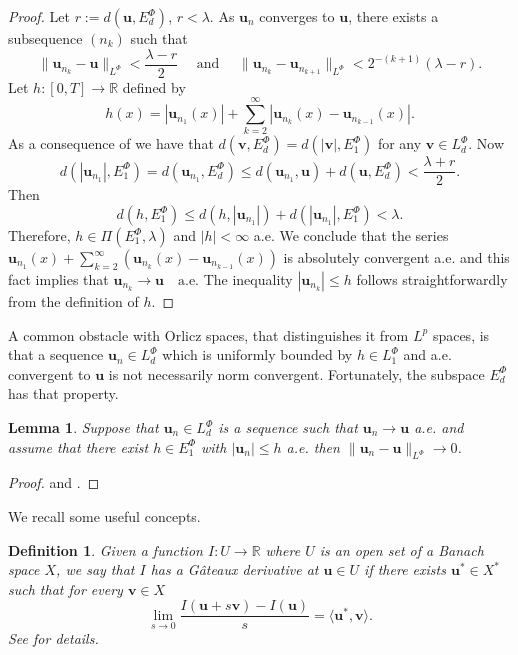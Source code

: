 \documentclass[twoside]{article}
\newtheorem{lem}[thm]{Lemma}
\newtheorem{defi}[thm]{Definition}
\theoremstyle{remark}
\newcommand{\orlnor}{\|_{L^{\Phi}}}
\newcommand{\lphi}{L^{\Phi}}
\newcommand{\ephi}{E^{\Phi}}
\renewcommand{\b}[1]{\boldsymbol{#1}}
\renewcommand{\leq}{\leqslant}
\begin{document}
\begin{proof}
Let $r:=d(\b{u},\ephi_d)$, $r<\lambda$. As $\b{u}_n$ converges to $\b{u}$, there exists a subsequence $(n_k)$ such that
\[\|\b{u}_{n_k}-\b{u}\orlnor<\frac{\lambda-r}{2}\quad \text{ and }\quad \|\b{u}_{n_k}-\b{u}_{n_{k+1}}\orlnor<2^{-(k+1)}(\lambda-r).\]
Let $h:[0,T]\rightarrow\mathbb{R}$ defined by
\begin{equation}\label{serie} h(x)=|\b{u}_{n_1}(x)|+\sum_{k=2}^{\infty}|\b{u}_{n_k}(x)-\b{u}_{n_{k-1}}(x)|.
\end{equation}
As a consequence  of \cite[Lemma 10.1]{KR} we have that $d(\b{v},\ephi_d)=d(|\b{v}|,\ephi_1)$ for any $\b{v}\in\lphi_d$. 
Now
\[d(|\b{u}_{n_1}|,\ephi_1)= d(\b{u}_{n_1},\ephi_d)\leq d(\b{u}_{n_1},\b{u})+d(\b{u},\ephi_d)<\frac{\lambda+r}{2}.\]
Then
\[d(h,\ephi_1)\leq d(h,|\b{u}_{n_1}|)+d(|\b{u}_{n_1}|,\ephi_1)< \lambda.\]
Therefore, $h\in\Pi(\ephi_1,\lambda)$ and  $|h|<\infty$ a.e. 
We conclude that the series \linebreak $\b{u}_{n_1}(x)+\sum_{k=2}^{\infty}(\b{u}_{n_k}(x)-\b{u}_{n_{k-1}}(x))$
is absolutely convergent a.e. and this fact implies that $\b{u}_{n_k}\rightarrow \b{u} \quad\text{a.e.}$ 
The inequality $|\b{u}_{n_k}|\leq h$ follows straightforwardly from the definition of $h$.
\end{proof}

A common obstacle with Orlicz spaces, that distinguishes it from $L^p$ spaces, is that a  sequence $\b{u}_n\in\lphi_d$ which is  uniformly bounded by $ h\in\lphi_1$ and a.e. convergent to $\b{u}$ is not necessarily norm convergent.
Fortunately, the subspace $\ephi_d$ has that property. 

\begin{lem}\label{lema_conv_may}
Suppose that $\b{u}_n \in\lphi_d$ is a sequence such that $\b{u}_n\to \b{u}$ a.e. and assume that there exist $h\in\ephi_1$ with $|\b{u}_n|\leq h$ a.e. 
then $\|\b{u}_n-\b{u}\orlnor\to 0$.
\end{lem}
\begin{proof}\cite[p. 84]{rao1991theory} and \cite[Thm. 10.3]{KR}.
\end{proof}


  We recall some useful concepts.

	\begin{defi} 
	Given a function $I:U\to\mathbb{R}$ where $U$ is an open set of a Banach space $X$,
we say that $I$ has a G\^ateaux derivative at $\b{u} \in U$ if there exists $\b{u}^*\in X^*$ such that for every $\b{v} \in X$
\[
\lim_{s \rightarrow 0}\frac{I(\b{u}+s\b{v})-I(\b{u}) }{s}=\langle \b{u}^* , \b{v}\rangle.
\]
See \cite{ambrosetti} for details. 
\end{defi}
\end{document}
